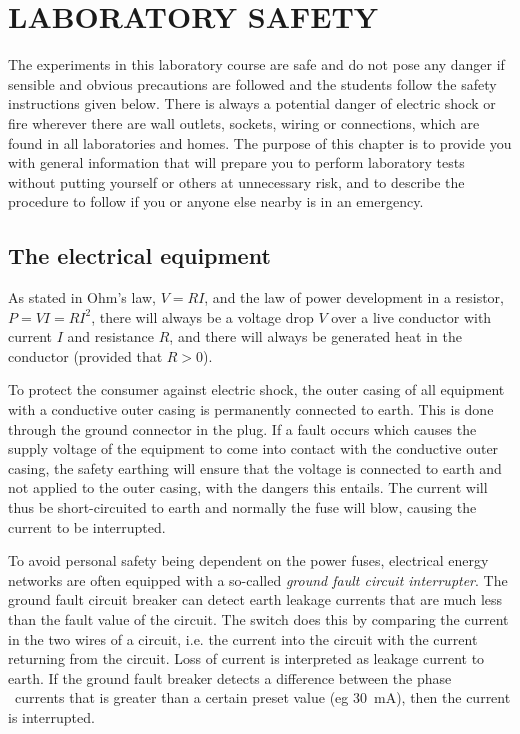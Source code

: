 \documentclass[../Elmag-labhefte-2022.tex]{subfiles}
\begin{document}
\setchapterpreamble[u]{\margintoc}
\chapter{LABORATORY SAFETY \label{ch.elektrisitet}}


The experiments in this laboratory course are safe and do not pose any danger if sensible and obvious precautions are followed and the students follow the safety instructions given below. There is always a potential danger of electric shock or fire wherever there are wall outlets, sockets, wiring or connections, which are found in all laboratories and homes. The purpose of this chapter is to provide you with general information that will prepare you to perform laboratory tests without putting yourself or others at unnecessary risk, and to describe the procedure to follow if you or anyone else nearby is in an emergency.

\section{The electrical equipment}



As stated in Ohm's law, $V = RI$, and the law of power development in a resistor, $P = VI = RI^2$, there will always be a voltage drop $V$ over a live conductor with current $I$ and resistance $R$, and there will always be generated heat in the conductor (provided that $R > 0$).
 

To protect the consumer against electric shock, the outer casing of all equipment with a conductive outer casing is permanently connected to earth. This is done through the ground connector in the plug. If a fault occurs which causes the supply voltage of the equipment to come into contact with the conductive outer casing, the safety earthing will ensure that the voltage is connected to earth and not applied to the outer casing, with the dangers this entails. The current will thus be short-circuited to earth and normally the fuse will blow, causing the current to be interrupted.

To avoid personal safety being dependent on the power fuses, electrical energy networks are often equipped with a so-called \emph{ground fault circuit interrupter}.
The ground fault circuit breaker can detect earth leakage currents that are much less than the fault value of the circuit. The switch does this by comparing the current in the two wires of a circuit, i.e. the current into the circuit with the current returning from the circuit. Loss of current is interpreted as leakage current to earth. If the ground fault breaker detects a difference between the phase \ currents that is greater than a certain preset value (eg \SI{30}{\milli\ampere}), then the current is interrupted.
\end{document}
